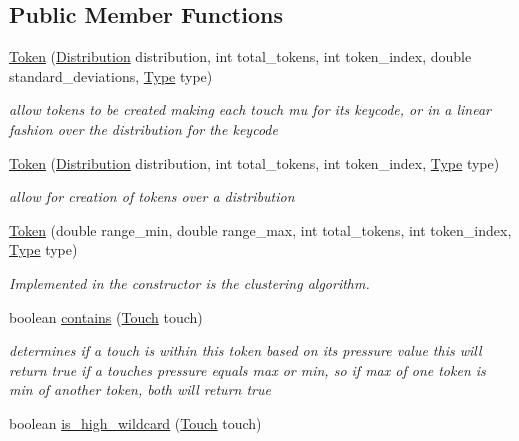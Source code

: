 \subsection*{Public Member Functions}
\begin{DoxyCompactItemize}
\item 
\hyperlink{classcomponents_1_1_token_a73f5eb6dda64ee3049237ca34f28a73c}{Token} (\hyperlink{classcomponents_1_1_distribution}{Distribution} distribution, int total\+\_\+tokens, int token\+\_\+index, double standard\+\_\+deviations, \hyperlink{enumcomponents_1_1_token_1_1_type}{Type} type)
\begin{DoxyCompactList}\small\item\em allow tokens to be created making each touch mu for its keycode, or in a linear fashion over the distribution for the keycode \end{DoxyCompactList}\item 
\hyperlink{classcomponents_1_1_token_aaecd79f21bdfa6dd838719b4cf736df0}{Token} (\hyperlink{classcomponents_1_1_distribution}{Distribution} distribution, int total\+\_\+tokens, int token\+\_\+index, \hyperlink{enumcomponents_1_1_token_1_1_type}{Type} type)
\begin{DoxyCompactList}\small\item\em allow for creation of tokens over a distribution \end{DoxyCompactList}\item 
\hyperlink{classcomponents_1_1_token_aec989a1d1fd6f860a84839091bf0586a}{Token} (double range\+\_\+min, double range\+\_\+max, int total\+\_\+tokens, int token\+\_\+index, \hyperlink{enumcomponents_1_1_token_1_1_type}{Type} type)
\begin{DoxyCompactList}\small\item\em Implemented in the constructor is the clustering algorithm. \end{DoxyCompactList}\item 
boolean \hyperlink{classcomponents_1_1_token_af023f6e27fd68da7705603161ccffe36}{contains} (\hyperlink{classcomponents_1_1_touch}{Touch} touch)
\begin{DoxyCompactList}\small\item\em determines if a touch is within this token based on its pressure value this will return true if a touches pressure equals max or min, so if max of one token is min of another token, both will return true \end{DoxyCompactList}\item 
boolean \hyperlink{classcomponents_1_1_token_a3e7b6d12602ff4da363a96701e2a365f}{is\+\_\+high\+\_\+wildcard} (\hyperlink{classcomponents_1_1_touch}{Touch} touch)

\end{DoxyCompactItemize}
